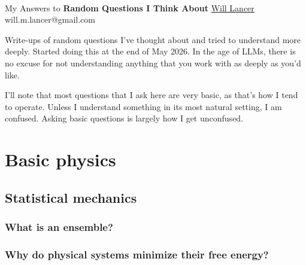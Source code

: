 \documentclass[11pt]{article}
\begin{document}
\thispagestyle{empty}
\bigskip \
\vspace{0.1cm}

\begin{center}
{\fontsize{22}{22} \selectfont My Answers to}
\vskip 16pt
{\fontsize{36}{36} \selectfont \bf \sffamily Random Questions I Think About}
\vskip 24pt
{\fontsize{18}{18} \selectfont \rmfamily \href{https://will-lancer.github.io}{Will Lancer}}
\vskip 6pt
{\fontsize{14}{14} \selectfont \ttfamily will.m.lancer@gmail.com}
\vskip 24pt
\end{center}

{\parindent0pt \baselineskip=15.5pt}
\noin
Write-ups of random questions I've thought about and tried to understand
more deeply. Started doing this at the end of May 2026. In the age of LLMs,
there is no excuse for not understanding anything that you work with as deeply
as you'd like.

I'll note that most questions that I ask here are very basic, as that's how I tend
to operate. Unless I understand something in its most natural setting, I am confused.
Asking basic questions is largely how I get unconfused.

\newpage
\microtoc
\newpage

\section{Basic physics}

\subsection{Statistical mechanics}

\subsubsection{What is an ensemble?}


\subsubsection{Why do physical systems minimize their free energy?}
\end{document}
